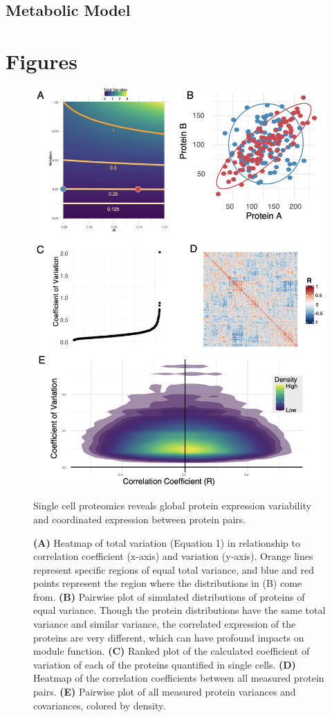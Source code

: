 \subsection{Metabolic Model}


\section{Figures}

\begin{figure}[hbt!]
\centering
\includegraphics[width=12cm, keepaspectratio]{figs/paper2/fig1.png}
\caption{Single cell proteomics reveals global protein expression variability and coordinated expression between protein pairs.}
\caption*{\textbf{(A)} Heatmap of total variation (Equation 1) in relationship to correlation coefficient (x-axis) and variation (y-axis). Orange lines represent specific regions of equal total variance, and blue and red points represent the region where the distributions in (B) come from. \textbf{(B)} Pairwise plot of simulated distributions of proteins of equal variance. Though the protein distributions have the same total variance and similar variance, the correlated expression of the proteins are very different, which can have profound impacts on module function. \textbf{(C)} Ranked plot of the calculated coefficient of variation of each of the proteins quantified in single cells. \textbf{(D)} Heatmap of the correlation coefficients between all measured protein pairs. \textbf{(E)} Pairwise plot of all measured protein variances and covariances, colored by density.}
\label{fig:paper2_fig1}
\end{figure}

